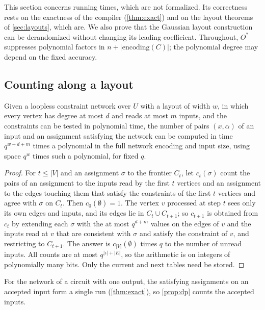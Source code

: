 \documentclass[11pt]{article}
\theoremstyle{plain}
\theoremstyle{definition}
\theoremstyle{remark}
\newcommand{\card}[1]{\lvert #1\rvert}
\begin{document}
This section concerns running times, which are not formalized. Its correctness rests on the
exactness of the compiler (\cref{thm:exact}) and on the layout theorems of \cref{sec:layouts},
which are. We also prove that the Gaussian layout construction can be derandomized without
changing its leading coefficient. Throughout, $O^*$ suppresses polynomial factors in
$n+\card{\mathrm{encoding}(C)}$; the polynomial degree may depend on the fixed accuracy.

\subsection{Counting along a layout}

\begin{proposition}
\label{prop:dp}
Given a loopless constraint network over $U$ with a layout of width $w$, in which every vertex has degree
at most $d$ and reads at most $m$ inputs, and the constraints can be tested in polynomial time,
the number of pairs $(x, \alpha)$ of an input and an assignment satisfying the network can be
computed in time $q^{w+d+m}$ times a polynomial in the full network encoding and input size,
using space $q^w$ times such a polynomial, for fixed $q$.
\end{proposition}

\begin{proof}
For $t \le \card V$ and an assignment $\sigma$ to the frontier $C_t$, let $c_t(\sigma)$ count the
pairs of an assignment to the inputs read by the first $t$ vertices and an assignment to the
edges touching them that satisfy the constraints of the first $t$ vertices and agree with
$\sigma$ on $C_t$. Then $c_0(\emptyset) = 1$. The vertex $v$ processed at step $t$ sees only its
own edges and inputs, and its edges lie in $C_t \cup C_{t+1}$; so $c_{t+1}$ is obtained from
$c_t$ by extending each $\sigma$ with the at most $q^{d + m}$ values on the edges of $v$ and the
inputs read at $v$ that are consistent with $\sigma$ and satisfy the constraint of $v$, and
restricting to $C_{t+1}$. The answer is $c_{\card V}(\emptyset)$ times $q$ to the number of
unread inputs. All counts are at most $q^{\card\iota + \card E}$, so the arithmetic is on
integers of polynomially many bits. Only the current and next tables need be stored.
\end{proof}

For the network of a circuit with one output, the satisfying assignments on an accepted input
form a single run (\cref{thm:exact}), so \cref{prop:dp} counts the accepted inputs.
\end{document}
